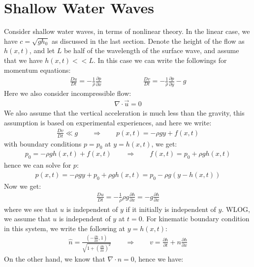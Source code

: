 \documentclass[11pt]{book}
\theoremstyle{break}
\theoremstyle{break}
\begin{document}
\section[Shallow Water Waves]{\color{red}Shallow Water Waves\color{black}}
Consider shallow water waves, in terms of nonlinear theory. In the linear case, we have $c = \sqrt{gh_0}$ as discussed in the last section. Denote the height of the flow as $h(x,t)$, and let $L$ be half of the wavelength of the surface wave, and assume that we have $h(x,t) <<L$. In this case we can write the followings for momentum equations:
\begin{align*}
\frac{Du}{Dt} = -\frac{1}{\rho}\frac{\partial p}{\partial x} \qquad\qquad\qquad \frac{Dv}{Dt} = -\frac{1}{\rho}\frac{\partial p}{\partial y}-g
\end{align*}
Here we also consider incompressible flow:
\begin{align*}
\nabla \cdot \vec{u} = 0
\end{align*}
We also assume that the vertical acceleration is much less than the gravity, this assumption is based on experimental experiences, and here we write:
\begin{align*}
\frac{Dv}{Dt} \ll g 
\qquad \Rightarrow \qquad
 p(x,t) = -\rho gy + f(x,t)
\end{align*}
with boundary conditions $p= p_0$ at $y = h(x,t)$, we get:
\begin{align*}
p_0 = -\rho g h(x,t) + f(x,t) \qquad \Rightarrow \qquad f(x,t) = p_0 + \rho gh(x,t)
\end{align*}
hence we can solve for $p$:
\begin{align*}
p(x,t) = -\rho g y + p_0 + \rho gh(x,t) = p_0 - \rho g( y-h(x,t))
\end{align*}
Now we get:
\begin{align}
\frac{Du}{Dt} = -\frac{1}{\rho} \rho g \frac{\partial h}{\partial x} = -g \frac{\partial h}{\partial x}
\end{align}
where we see that $u$ is independent of $y$ if it initially is independent of $y$. WLOG, we assume that $u$ is independent of $y$ at $t=0$. For kinematic boundary condition in this system, we write the following at $y=h(x,t)$:
\begin{align}
\hat{n} = \frac{(-\frac{\partial h}{\partial x}, 1)}{\sqrt{1+\left(\frac{\partial h}{\partial x}\right)^2}} \qquad \Rightarrow \qquad v = \frac{\partial h}{\partial t} + n \frac{\partial h}{\partial x}  
\end{align}
On the other hand, we know that $\nabla \cdot n = 0$, hence we have:
\end{document}
